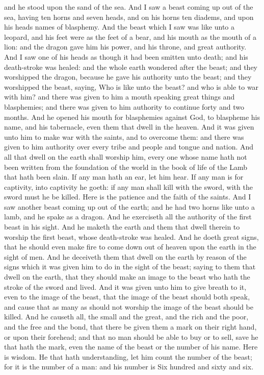 and he stood upon the sand of the sea. And I saw a beast coming up out of the sea, having ten horns and seven heads, and on his horns ten diadems, and upon his heads names of blasphemy. And the beast which I saw was like unto a leopard, and his feet were as the feet of a bear, and his mouth as the mouth of a lion: and the dragon gave him his power, and his throne, and great authority. And I saw one of his heads as though it had been smitten unto death; and his death-stroke was healed: and the whole earth wondered after the beast; and they worshipped the dragon, because he gave his authority unto the beast; and they worshipped the beast, saying, Who is like unto the beast? and who is able to war with him? and there was given to him a mouth speaking great things and blasphemies; and there was given to him authority to continue forty and two months. And he opened his mouth for blasphemies against God, to blaspheme his name, and his tabernacle, even them that dwell in the heaven. And it was given unto him to make war with the saints, and to overcome them: and there was given to him authority over every tribe and people and tongue and nation. And all that dwell on the earth shall worship him, every one whose name hath not been written from the foundation of the world in the book of life of the Lamb that hath been slain. If any man hath an ear, let him hear. If any man is for captivity, into captivity he goeth: if any man shall kill with the sword, with the sword must he be killed. Here is the patience and the faith of the saints.  And I saw another beast coming up out of the earth; and he had two horns like unto a lamb, and he spake as a dragon. And he exerciseth all the authority of the first beast in his sight. And he maketh the earth and them that dwell therein to worship the first beast, whose death-stroke was healed. And he doeth great signs, that he should even make fire to come down out of heaven upon the earth in the sight of men. And he deceiveth them that dwell on the earth by reason of the signs which it was given him to do in the sight of the beast; saying to them that dwell on the earth, that they should make an image to the beast who hath the stroke of the sword and lived. And it was given unto him to give breath to it, even to the image of the beast, that the image of the beast should both speak, and cause that as many as should not worship the image of the beast should be killed. And he causeth all, the small and the great, and the rich and the poor, and the free and the bond, that there be given them a mark on their right hand, or upon their forehead; and that no man should be able to buy or to sell, save he that hath the mark, even the name of the beast or the number of his name. Here is wisdom. He that hath understanding, let him count the number of the beast; for it is the number of a man: and his number is Six hundred and sixty and six. 

